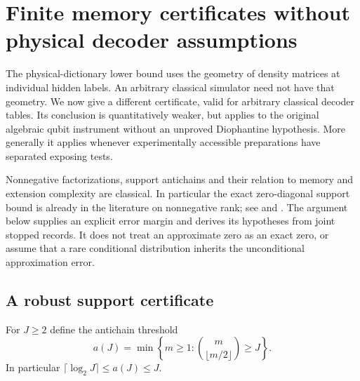 \section{Finite memory certificates without physical decoder assumptions}
\label{sec:r77-unrestricted-approximation}

The physical-dictionary lower bound uses the geometry of density matrices
at individual hidden labels.  An arbitrary classical simulator need not
have that geometry.  We now give a different certificate, valid for
arbitrary classical decoder tables.  Its conclusion is quantitatively
weaker, but applies to the original algebraic qubit instrument without
an unproved Diophantine hypothesis.  More generally it applies whenever
experimentally accessible preparations have separated exposing tests.

Nonnegative factorizations, support antichains and their relation to
memory and extension complexity are classical.  In particular the exact
zero-diagonal support bound is already in the literature on nonnegative
rank; see \cite[Section 4.1 and Corollary 4.13]{GPT13} and
\cite[Section 3.1]{VandaeleGillisGlineur17}.  The argument below supplies
an explicit error margin and derives its hypotheses from joint stopped
records.  It does not treat an approximate zero as an exact zero, or
assume that a rare conditional distribution inherits the unconditional
approximation error.

\subsection{A robust support certificate}

For $J\ge2$ define the antichain threshold
\begin{equation}\label{eq:r77-antichain-threshold}
 a(J)=\min\left\{m\ge1:
                   \binom{m}{\lfloor m/2\rfloor}\ge J\right\}.
\end{equation}
In particular $\lceil\log_2J\rceil\le a(J)\le J$.

